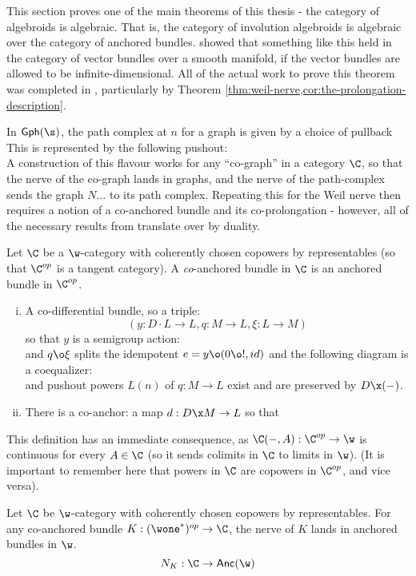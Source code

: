 This section proves one of the main theorems of this thesis - the category of algebroids is algebraic. That is, the category of involution algebroids is algebraic over the category of anchored bundles. \cite{Kapranov2007} showed that something like this held in the category of vector bundles over a smooth manifold, if the vector bundles are allowed to be infinite-dimensional. All of the actual work to prove this theorem was completed in , particularly by Theorem \ref{thm:weil-nerve,cor:the-prolongation-description}.

	


In $\mathsf{Gph}(\s)$, the path complex at $n$ for a graph is given by a choice of pullback
\[\]
This is represented by the following pushout:
\[ \]
A construction of this flavour works for any ``co-graph'' in a category $\C$, so that the nerve of the co-graph lands in graphs, and the nerve of the path-complex sends the graph $N\dots$ to its path complex. Repeating this for the Weil nerve then requires a notion of a co-anchored bundle and its co-prolongation - however, all of the necessary results from  translate over by duality.

\begin{definition}%
	\label{def:coanc-bundle}
	Let $\C$ be a $\w$-category with coherently chosen copowers by representables (so that $\C^{op}$ is a tangent category). A \emph{co}-anchored bundle in $\C$ is an anchored bundle in $\C^{op}$.
	\begin{enumerate}[(i)]
		\item A co-differential bundle, so a triple:
		      \[
			      (y:D \cdot L \to L, q:M \to L, \xi:L \to M)
		      \]
		      so that $y$ is a semigroup action:
		      \[\]
		      and $q \o \xi$ splits the idempotent $e = y \o (0\o !, id)$ and the following diagram is a coequalizer:\[\]
		      and pushout powers $L(n)$ of $q:M \to L$ exist and are preserved by $D \x (-)$.
		\item There is a co-anchor: a map $d:D\x M \to L$ so that
		      \[\]
	\end{enumerate}
\end{definition}
This definition has an immediate consequence, as $\C(-, A):\C^{op} \to \w$ is continuous for every $A \in \C$ (so it sends colimits in $\C$ to limits in $\w$). (It is important to remember here that powers in $\C$ are copowers in $\C^{op}$, and vice versa).
\begin{lemma}%
	\label{lem:nerve-of-coanc}
	Let $\C$ be $\w$-category with coherently chosen copowers by representables.
	For any co-anchored bundle $K: (\wone^*)^{op} \to \C$, the nerve of $K$ lands in anchored bundles in $\w$.
	\[
		N_K: \C \to \mathsf{Anc}(\w)
	\]
\end{lemma}

